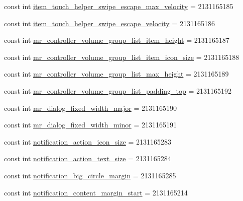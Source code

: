 \begin{CompactItemize}
\item 
const int \hyperlink{class__2doo_1_1_droid_1_1_resource_1_1_dimension_2effef51071ace35b2e016ae86abf904}{item\_\-touch\_\-helper\_\-swipe\_\-escape\_\-max\_\-velocity} = 2131165185
\item 
const int \hyperlink{class__2doo_1_1_droid_1_1_resource_1_1_dimension_851e36e8468297c068f134744a5ed96a}{item\_\-touch\_\-helper\_\-swipe\_\-escape\_\-velocity} = 2131165186
\item 
const int \hyperlink{class__2doo_1_1_droid_1_1_resource_1_1_dimension_dc476524c5d9c44555658399b3fbf3d9}{mr\_\-controller\_\-volume\_\-group\_\-list\_\-item\_\-height} = 2131165187
\item 
const int \hyperlink{class__2doo_1_1_droid_1_1_resource_1_1_dimension_c7c9fcf79511d853161a031cca5a4210}{mr\_\-controller\_\-volume\_\-group\_\-list\_\-item\_\-icon\_\-size} = 2131165188
\item 
const int \hyperlink{class__2doo_1_1_droid_1_1_resource_1_1_dimension_533c39fa4aed179028032fe7e58d8b71}{mr\_\-controller\_\-volume\_\-group\_\-list\_\-max\_\-height} = 2131165189
\item 
const int \hyperlink{class__2doo_1_1_droid_1_1_resource_1_1_dimension_05db2d93cf37e4c8434dd7606dee90be}{mr\_\-controller\_\-volume\_\-group\_\-list\_\-padding\_\-top} = 2131165192
\item 
const int \hyperlink{class__2doo_1_1_droid_1_1_resource_1_1_dimension_ed622d1e310f46c132ae57eb41574dba}{mr\_\-dialog\_\-fixed\_\-width\_\-major} = 2131165190
\item 
const int \hyperlink{class__2doo_1_1_droid_1_1_resource_1_1_dimension_ef583760914e97d671d1c6eb5615e5fa}{mr\_\-dialog\_\-fixed\_\-width\_\-minor} = 2131165191
\item 
const int \hyperlink{class__2doo_1_1_droid_1_1_resource_1_1_dimension_643fc4f223b9156e9276ee3e10e8cd5f}{notification\_\-action\_\-icon\_\-size} = 2131165283
\item 
const int \hyperlink{class__2doo_1_1_droid_1_1_resource_1_1_dimension_13d86eff6797f4f916ec9f2dd9899a52}{notification\_\-action\_\-text\_\-size} = 2131165284
\item 
const int \hyperlink{class__2doo_1_1_droid_1_1_resource_1_1_dimension_c2aec461cd0594c1f1acd7b0a570c5fb}{notification\_\-big\_\-circle\_\-margin} = 2131165285
\item 
const int \hyperlink{class__2doo_1_1_droid_1_1_resource_1_1_dimension_b926c268c606342412970e15c6ef90c9}{notification\_\-content\_\-margin\_\-start} = 2131165214
\item 

\end{CompactItemize}
